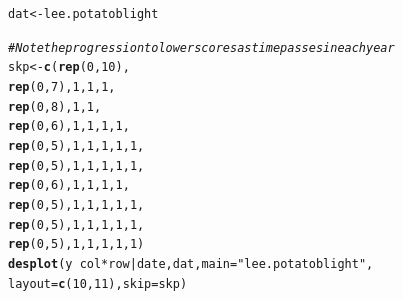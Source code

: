 \documentclass[12pt]{article}\usepackage[]{graphicx}\usepackage[]{color}
\makeatletter
\newcommand{\hlnum}[1]{\textcolor[rgb]{0.686,0.059,0.569}{#1}}%
\newcommand{\hlstr}[1]{\textcolor[rgb]{0.192,0.494,0.8}{#1}}%
\newcommand{\hlcom}[1]{\textcolor[rgb]{0.678,0.584,0.686}{\textit{#1}}}%
\newcommand{\hlopt}[1]{\textcolor[rgb]{0,0,0}{#1}}%
\newcommand{\hlstd}[1]{\textcolor[rgb]{0.345,0.345,0.345}{#1}}%
\newcommand{\hlkwb}[1]{\textcolor[rgb]{0.69,0.353,0.396}{#1}}%
\newcommand{\hlkwc}[1]{\textcolor[rgb]{0.333,0.667,0.333}{#1}}%
\newcommand{\hlkwd}[1]{\textcolor[rgb]{0.737,0.353,0.396}{\textbf{#1}}}%
\newenvironment{kframe}{%
 \def\at@end@of@kframe{}%
 \ifinner\ifhmode%
  \def\at@end@of@kframe{\end{minipage}}%
  \begin{minipage}{\columnwidth}%
 \fi\fi%
 \def\FrameCommand##1{\hskip\@totalleftmargin \hskip-\fboxsep
 \colorbox{shadecolor}{##1}\hskip-\fboxsep
     \hskip-\linewidth \hskip-\@totalleftmargin \hskip\columnwidth}%
 \MakeFramed {\advance\hsize-\width
   \@totalleftmargin\z@ \linewidth\hsize
   \@setminipage}}%
 {\par\unskip\endMakeFramed%
 \at@end@of@kframe}
\newenvironment{knitrout}{}{} %
\makeatother
\begin{document}
\begin{knitrout}
\color{fgcolor}\begin{kframe}
\begin{alltt}
\hlstd{dat} \hlkwb{<-} \hlstd{lee.potatoblight}

\hlcom{# Note the progression to lower scores as time passes in each year}
\hlstd{skp} \hlkwb{<-} \hlkwd{c}\hlstd{(}\hlkwd{rep}\hlstd{(}\hlnum{0}\hlstd{,}\hlnum{10}\hlstd{),}
         \hlkwd{rep}\hlstd{(}\hlnum{0}\hlstd{,}\hlnum{7}\hlstd{),}\hlnum{1}\hlstd{,}\hlnum{1}\hlstd{,}\hlnum{1}\hlstd{,}
         \hlkwd{rep}\hlstd{(}\hlnum{0}\hlstd{,}\hlnum{8}\hlstd{),}\hlnum{1}\hlstd{,}\hlnum{1}\hlstd{,}
         \hlkwd{rep}\hlstd{(}\hlnum{0}\hlstd{,}\hlnum{6}\hlstd{),}\hlnum{1}\hlstd{,}\hlnum{1}\hlstd{,}\hlnum{1}\hlstd{,}\hlnum{1}\hlstd{,}
         \hlkwd{rep}\hlstd{(}\hlnum{0}\hlstd{,}\hlnum{5}\hlstd{),}\hlnum{1}\hlstd{,}\hlnum{1}\hlstd{,}\hlnum{1}\hlstd{,}\hlnum{1}\hlstd{,}\hlnum{1}\hlstd{,}
         \hlkwd{rep}\hlstd{(}\hlnum{0}\hlstd{,}\hlnum{5}\hlstd{),}\hlnum{1}\hlstd{,}\hlnum{1}\hlstd{,}\hlnum{1}\hlstd{,}\hlnum{1}\hlstd{,}\hlnum{1}\hlstd{,}
         \hlkwd{rep}\hlstd{(}\hlnum{0}\hlstd{,}\hlnum{6}\hlstd{),}\hlnum{1}\hlstd{,}\hlnum{1}\hlstd{,}\hlnum{1}\hlstd{,}\hlnum{1}\hlstd{,}
         \hlkwd{rep}\hlstd{(}\hlnum{0}\hlstd{,}\hlnum{5}\hlstd{),}\hlnum{1}\hlstd{,}\hlnum{1}\hlstd{,}\hlnum{1}\hlstd{,}\hlnum{1}\hlstd{,}\hlnum{1}\hlstd{,}
         \hlkwd{rep}\hlstd{(}\hlnum{0}\hlstd{,}\hlnum{5}\hlstd{),}\hlnum{1}\hlstd{,}\hlnum{1}\hlstd{,}\hlnum{1}\hlstd{,}\hlnum{1}\hlstd{,}\hlnum{1}\hlstd{,}
         \hlkwd{rep}\hlstd{(}\hlnum{0}\hlstd{,}\hlnum{5}\hlstd{),}\hlnum{1}\hlstd{,}\hlnum{1}\hlstd{,}\hlnum{1}\hlstd{,}\hlnum{1}\hlstd{,}\hlnum{1}\hlstd{)}
\hlkwd{desplot}\hlstd{(y} \hlopt{~} \hlstd{col}\hlopt{*}\hlstd{row}\hlopt{|}\hlstd{date, dat,} \hlkwc{main}\hlstd{=}\hlstr{"lee.potatoblight"}\hlstd{,}
        \hlkwc{layout}\hlstd{=}\hlkwd{c}\hlstd{(}\hlnum{10}\hlstd{,}\hlnum{11}\hlstd{),}\hlkwc{skip}\hlstd{=skp)}
\end{alltt}


{\ttfamily\noindent\color{warningcolor}{Warning: coercing argument of type 'double' to logical}}\end{kframe}


\end{knitrout}
\end{document}
